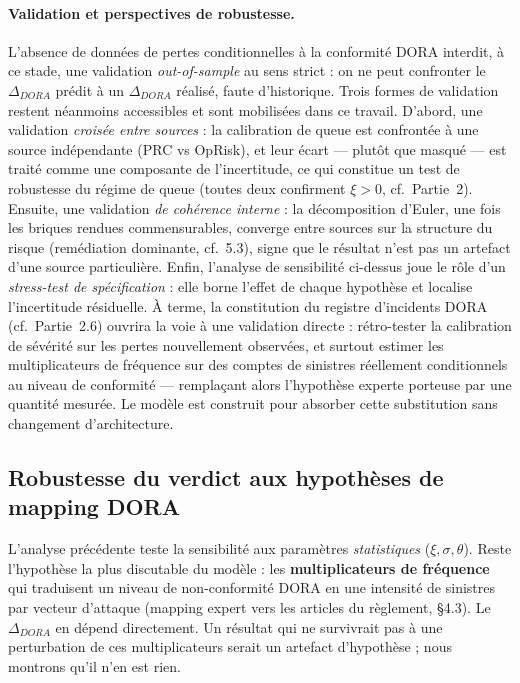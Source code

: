 \documentclass[11pt,a4paper]{article}
\theoremstyle{navystyle}
\theoremstyle{navydef}
\begin{document}
\paragraph{Validation et perspectives de robustesse.} L'absence de données de
pertes conditionnelles à la conformité DORA interdit, à ce stade, une
validation \emph{out-of-sample} au sens strict : on ne peut confronter le
$\Delta_{DORA}$ prédit à un $\Delta_{DORA}$ réalisé, faute d'historique. Trois
formes de validation restent néanmoins accessibles et sont mobilisées dans ce
travail. D'abord, une validation \emph{croisée entre sources} : la calibration
de queue est confrontée à une source indépendante (PRC vs OpRisk), et leur
écart --- plutôt que masqué --- est traité comme une composante de
l'incertitude, ce qui constitue un test de robustesse du régime de queue
(toutes deux confirment $\xi > 0$, cf.\ Partie~2). Ensuite, une validation
\emph{de cohérence interne} : la décomposition d'Euler, une fois les briques
rendues commensurables, converge entre sources sur la structure du risque
(remédiation dominante, cf.\ 5.3), signe que le résultat n'est pas un artefact
d'une source particulière. Enfin, l'analyse de sensibilité ci-dessus joue le
rôle d'un \emph{stress-test de spécification} : elle borne l'effet de chaque
hypothèse et localise l'incertitude résiduelle. À terme, la constitution du
registre d'incidents DORA (cf.\ Partie~2.6) ouvrira la voie à une validation
directe : rétro-tester la calibration de sévérité sur les pertes nouvellement
observées, et surtout estimer les multiplicateurs de fréquence sur des comptes
de sinistres réellement conditionnels au niveau de conformité --- remplaçant
alors l'hypothèse experte porteuse par une quantité mesurée. Le modèle est
construit pour absorber cette substitution sans changement d'architecture.

\subsection{Robustesse du verdict aux hypothèses de mapping DORA}
\label{sec:mapping-sensitivity}

L'analyse précédente teste la sensibilité aux paramètres \emph{statistiques} ($\xi,\sigma,\theta$). Reste l'hypothèse la plus discutable du modèle : les \textbf{multiplicateurs de fréquence} qui traduisent un niveau de non-conformité DORA en une intensité de sinistres par vecteur d'attaque (mapping expert vers les articles du règlement, §4.3). Le $\Delta_{DORA}$ en dépend directement. Un résultat qui ne survivrait pas à une perturbation de ces multiplicateurs serait un artefact d'hypothèse ; nous montrons qu'il n'en est rien.
\end{document}
